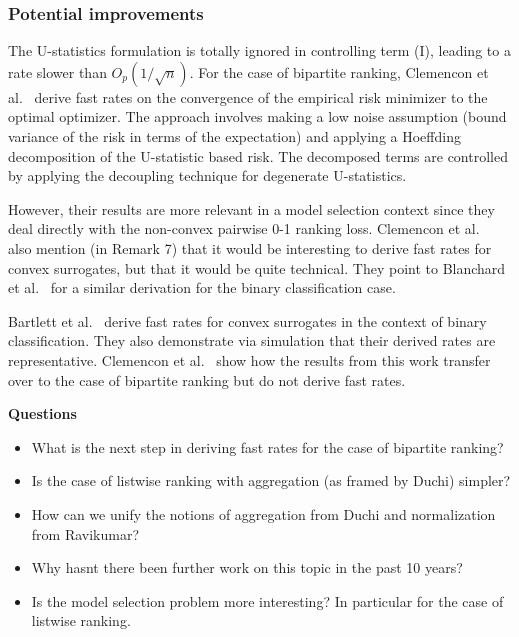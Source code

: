 \documentclass[a4paper,10pt]{article}
\begin{document}
\subsubsection{Potential improvements}
The U-statistics formulation is totally ignored in controlling term
(I), leading to a rate slower than \(O_p(1/\sqrt n)\). For the case of
bipartite ranking, Clemencon et
al.~\cite{clemencon-2008-ranking-rates} derive fast rates on the
convergence of the empirical risk minimizer to the optimal
optimizer. The approach involves making a low noise assumption (bound
variance of the risk in terms of the expectation) and applying a
Hoeffding decomposition of the U-statistic based risk. The decomposed
terms are controlled by applying the decoupling technique for
degenerate U-statistics.

However, their results are more relevant in a
model selection context since they deal directly with the non-convex
pairwise 0-1 ranking loss. Clemencon et
al.~\cite{clemencon-2008-ranking-rates} also mention (in Remark 7)
that it would be interesting to derive fast rates for convex
surrogates, but that it would be quite technical. They point to
Blanchard et al.~\cite{blanchard-2003-rates} for a similar derivation
for the binary classification case.

Bartlett et al.~\cite{bartlett-2006-risk} derive fast rates for convex
surrogates in the context of binary classification. They also
demonstrate via simulation that their derived rates are
representative. Clemencon et al.~\cite{clemencon-2008-ranking-rates}
show how the results from this work transfer over to the case of
bipartite ranking but do not derive fast rates.

\textbf{Questions}

\begin{itemize}
  \item What is the next step in deriving fast rates for the case of bipartite ranking?
  \item Is the case of listwise ranking with aggregation (as framed by Duchi) simpler?
  \item How can we unify the notions of aggregation from Duchi and normalization from Ravikumar?
  \item Why hasnt there been further work on this topic in the past 10 years?
  \item Is the model selection problem more interesting? In particular for the case of listwise ranking.
\end{itemize}

{}
\end{document}
